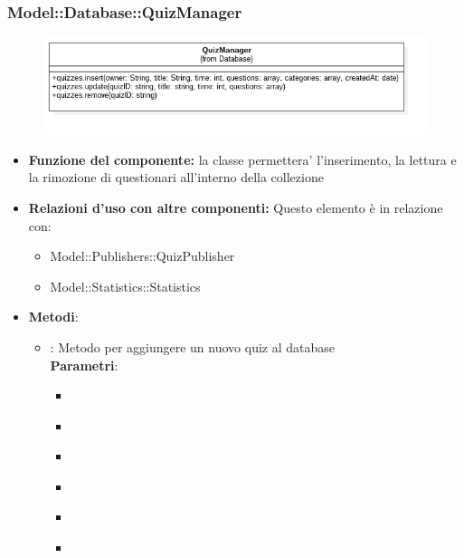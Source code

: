 \subsubsection{Model::Database::QuizManager}
\begin{figure}[h!]
\begin{center}
	\includegraphics[scale=0.4]{../images/Model/Database/QuizManager.png}
\end{center}
\end{figure}
\begin{itemize}
\item\textbf{Funzione del componente:} la classe permettera' l'inserimento, la lettura e la rimozione di questionari all'interno della collezione
\item\textbf{Relazioni d'uso con altre componenti:}
Questo elemento è in relazione con:
\begin{itemize}
	\item Model::Publishers::QuizPublisher\\
	\item Model::Statistics::Statistics\\
\end{itemize}
\item\textbf{Metodi}:
\begin{itemize}
	\item{} : Metodo per aggiungere un nuovo quiz al database\\
	\textbf{Parametri}:
	\begin{itemize}
		\item{}\\
		\item{}\\
		\item{}\\
		\item{}\\
		\item{}\\
		\item{}\\

\end{itemize}
\end{itemize}
\end{itemize}
